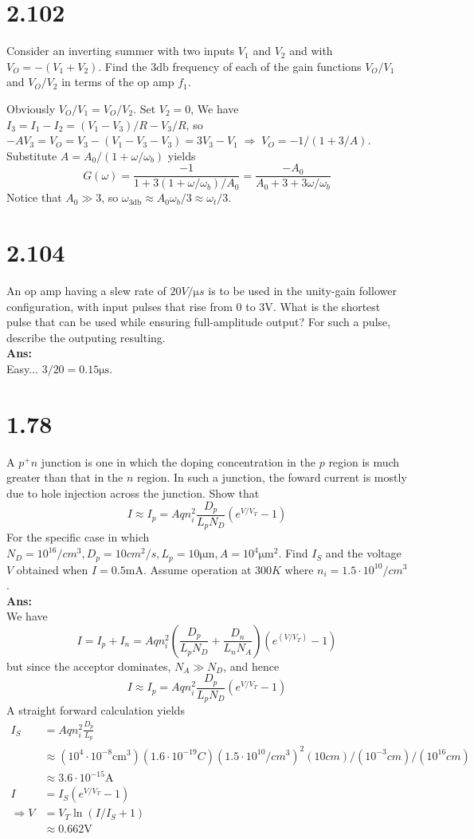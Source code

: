 \documentclass[12pt, a4paper]{article}
\newcommand{\samp}{\si{\ampere}}
\newcommand{\smia}{\si{\milli\ampere}}
\newcommand{\svol}{\si{\volt}}
\newcommand{\sdb}{\si{\decibel}}
\newcommand{\Ans}{{\\ \bf Ans:} \\}
\begin{document}
\section{2.102}
Consider an inverting summer with two inputs $V_1$ and $V_2$ and with $V_O = -(V_1 + V_2)$. Find the $3 \sdb$ frequency of each of the gain functions $V_O / V_1$ and $V_O / V_2$ in terms of the op amp $f_1$.

Obviously $V_O / V_1 = V_O / V_2$.
Set $V_2 = 0$, We have $I_3 = I_1 - I_2 = (V_1 - V_3) / R - V_3 / R$, so $-AV_3 = V_O = V_3 - (V_1 - V_3 - V_3) = 3V_3 - V_1 \; \Rightarrow \; V_O = -1 / (1 + 3 / A)$. Substitute $A = A_0 / (1 + \omega / \omega_b)$ yields 
\[
  G(\omega) = \frac{-1}{1 + 3(1 + \omega / \omega_b) / A_0} = \frac{-A_0}{A_0 + 3 + 3 \omega / \omega_b}
\]
Notice that $A_0 \gg 3$, so $\omega_{3\sdb} \approx A_0 \omega_b / 3 \approx \omega_t / 3 $.

\section{2.104}
An op amp having a slew rate of $20 \si{V/\micro s}$ is to be used in the unity-gain follower configuration, with input pulses that rise from $0$ to $3\svol$. What is the shortest pulse that can be used while ensuring full-amplitude output? For such a pulse, describe the outputing resulting.
\Ans
Easy... $3 / 20 = 0.15 \si{\micro\second}$.

\section{1.78}
A $p^+n$ junction is one in which the doping concentration in the $p$ region is much greater than that in the $n$ region. In such a junction, the foward current is mostly due to hole injection across the junction. Show that
\[
  I \approx I_p = Aqn_i^2\frac{D_p}{L_p N_D} \left( e^{V/V_T} - 1 \right)
\]
For the specific case in which $N_D = 10^{16} \si{/cm^3}, D_p = 10 \si{cm^2/s}, L_p = 10 \si{\micro\meter}, A = 10^4 \si{\micro \meter^2}$. Find $I_S$ and the voltage $V$ obtained when $I = 0.5\smia$. Assume operation at $300 \si{K}$ where $n_i = 1.5 \cdot 10^{10} \si{/cm^3}$.
\Ans
We have
\[
  I = I_p + I_n = Aqn_i^2 \left( \frac{D_p}{L_p N_D} + \frac{D_n}{L_n N_A} \right) \left(e^{(V / V_T)} - 1 \right)
\]
but since the acceptor dominates, $N_A \gg N_D$, and hence
\[
  I \approx I_p = Aqn_i^2\frac{D_p}{L_p N_D} \left( e^{V/V_T} - 1 \right)
\]
A straight forward calculation yields
\begin{align*}
  I_S &= Aqn_i^2\frac{D_p}{L_p}  \\
  &\approx (10^4 \cdot 10^{-8} \si{\centi\meter^3})(1.6 \cdot 10^{-19} \si{C})(1.5\cdot10^{10} \si{/cm^3})^2 (10 \si{cm}) / (10^{-3} \si{cm}) / (10^{16} \si{cm}) \\
  &\approx 3.6 \cdot 10^{-15} \samp \\
  I &= I_S \left( e^{V/V_T} - 1\right) \\
  \Rightarrow V &= V_T \ln (I / I_S + 1) \\
  &\approx 0.662 \svol
\end{align*}
\end{document}
